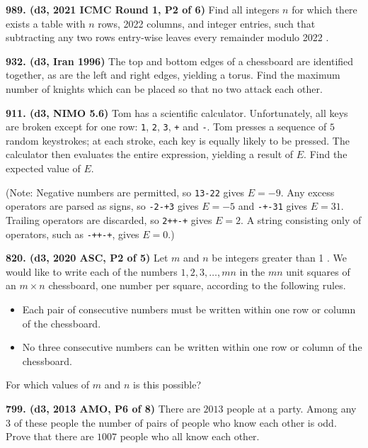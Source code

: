 \documentclass{article}
\begin{document}
        \textbf{989. (\color{red}d3\color{black}, 2021 ICMC Round 1, P2 of 6)} Find all integers $n$ for which there exists a table with $n$ rows, 2022 columns, and integer entries, such that subtracting any two rows entry-wise leaves every remainder modulo 2022 .

        \textbf{932. (\color{red}d3\color{black}, Iran 1996)} The top and bottom edges of a chessboard are identified together, as are the left and right edges, yielding a torus. Find the maximum number of knights which can be placed so that no two attack each other.

        \textbf{911. (\color{red}d3\color{black}, NIMO 5.6)} Tom has a scientific calculator.
        Unfortunately,
        all keys are broken except for one row:
        \verb$1$, \verb$2$, \verb$3$, \verb$+$ and \verb$-$.
        Tom presses a sequence of $5$ random keystrokes;
        at each stroke, each key is equally likely to be pressed.
        The calculator then evaluates the entire expression,
        yielding a result of $E$.
        Find the expected value of $E$.

        (Note: Negative numbers are permitted, so \verb$13-22$ gives $E = -9$.
        Any excess operators are parsed as signs, so \verb$-2-+3$ gives $E=-5$
        and \verb$-+-31$ gives $E = 31$.
        Trailing operators are discarded, so \verb$2++-+$ gives $E=2$.
        A string consisting only of operators, such as \verb$-++-+$, gives $E=0$.)

        \textbf{820. (\color{red}d3\color{black}, 2020 ASC, P2 of 5)} Let $m$ and $n$ be integers greater than 1 . We would like to write each of the numbers $1,2,3, \ldots, m n$ in the $m n$ unit squares of an $m \times n$ chessboard, one number per square, according to the following rules.
        \begin{itemize}
                \item Each pair of consecutive numbers must be written within one row or column of the chessboard.
                \item No three consecutive numbers can be written within one row or column of the chessboard.
        \end{itemize}
        For which values of $m$ and $n$ is this possible?

        \textbf{799. (\color{red}d3\color{black}, 2013 AMO, P6 of 8)} There are $2013$ people at a party. Among any $3$ of these people the number of pairs of people who know each other is odd. Prove that there are $1007$ people who all know each other.
\end{document}
